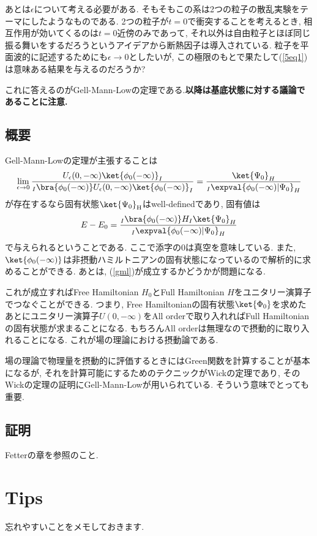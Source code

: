 あとは$\epsilon$について考える必要がある. そもそもこの系は2つの粒子の散乱実験をテーマにしたようなものである. 2つの粒子が$t = 0$で衝突することを考えるとき, 相互作用が効いてくるのは$t = 0$近傍のみであって, それ以外は自由粒子とほぼ同じ振る舞いをするだろうというアイデアから断熱因子は導入されている. 粒子を平面波的に記述するためにも$\epsilon\rightarrow 0$としたいが, この極限のもとで果たして(\ref{5eq1})は意味ある結果を与えるのだろうか?

これに答えるのがGell-Mann-Lowの定理である.\textbf{以降は基底状態に対する議論であることに注意.}
\subsection{概要}
Gell-Mann-Lowの定理が主張することは
\begin{eqnarray}
  \lim_{\epsilon\rightarrow0}\frac{U_\epsilon(0, -\infty)\ket{\phi_0(-\infty)}_I}{_I\bra{\phi_0(-\infty)}U_\epsilon(0, -\infty)\ket{\phi_0(-\infty)}_I} = \frac{\ket{\Psi_0}_H}{_I\expval{\phi_0(-\infty)|\Psi_0}_H}\label{gml}
\end{eqnarray}
が存在するなら固有状態$\ket{\Psi_0}_{\rm H}$はwell-definedであり, 固有値は
\begin{eqnarray}
  E-E_0 = \frac{_I\bra{\phi_0(-\infty)}H_I\ket{\Psi_0}_H}{_I\expval{\phi_0(-\infty)|\Psi_0}_H}
\end{eqnarray}
で与えられるということである. ここで添字の0は真空を意味している. また, $\ket{\phi_0(-\infty)}$は非摂動ハミルトニアンの固有状態になっているので解析的に求めることができる. あとは, (\ref{gml})が成立するかどうかが問題になる.

これが成立すればFree Hamiltonian $H_0$とFull Hamiltonian $H$をユニタリー演算子でつなぐことができる. つまり, Free Hamiltonianの固有状態$\ket{\Phi_0}$を求めたあとにユニタリー演算子$U(0, -\infty)$をAll orderで取り入れればFull Hamiltonianの固有状態が求まることになる. もちろんAll orderは無理なので摂動的に取り入れることになる. これが場の理論における摂動論である.

場の理論で物理量を摂動的に評価するときにはGreen関数を計算することが基本になるが, それを計算可能にするためのテクニックがWickの定理であり, そのWickの定理の証明にGell-Mann-Lowが用いられている. そういう意味でとっても重要. 
\subsection{証明}
Fetterの章を参照のこと. 
\section{Tips}
忘れやすいことをメモしておきます.
